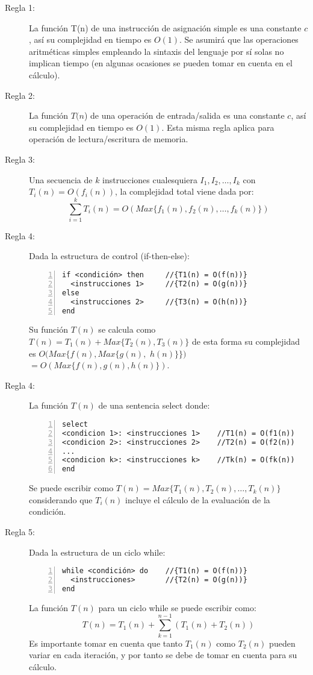 \begin{description}
\item[Regla 1:] La función T(n) de una instrucción de asignación simple es una constante $c$, así su complejidad en tiempo es $O(1)$. Se asumirá que las operaciones aritméticas simples empleando la sintaxis del lenguaje por sí solas no implican tiempo (en algunas ocasiones se pueden tomar en cuenta en el cálculo).

\item[Regla 2:] La función $T(n$) de una operación de entrada/salida es una constante $c$, así su complejidad en tiempo es $O(1)$. Esta misma regla aplica para operación de lectura/escritura de memoria.

\item[Regla 3:] Una secuencia de $k$ instrucciones cualesquiera $I_1, I_2, \dots , I_k$ con $T_i(n) = O(f_i(n))$, la complejidad total viene dada por:
$$\sum_{i=1}^{k}{T_i(n)}=O(Max\{f_1(n), f_2(n), \dots, f_k(n)\})$$

\item[Regla 4:] Dada la estructura de control (if-then-else):
\begin{lstlisting}[upquote=true, language=pseudo, numbers=left]
if <condición> then		//{T1(n) = O(f(n))}
  <instrucciones 1>		//{T2(n) = O(g(n))}
else
  <instrucciones 2>		//{T3(n) = O(h(n))}
end
\end{lstlisting}
\noindent Su función $T(n)$ se calcula como $T(n) = T_1(n) + Max\{T_2(n), T_3(n)\}$ de esta forma su complejidad es $O(Max\{f(n), Max\{g(n),$ $h(n)\}\})$ $= O(Max\{f(n), g(n), h(n)\})$.

\item[Regla 4:] La función $T(n)$ de una sentencia select donde:
\begin{lstlisting}[upquote=true, language=pseudo, numbers=left]
select
<condicion 1>: <instrucciones 1>	//T1(n) = O(f1(n))
<condicion 2>: <instrucciones 2>	//T2(n) = O(f2(n))
...
<condicion k>: <instrucciones k>	//Tk(n) = O(fk(n))
end
\end{lstlisting}

Se puede escribir como $T(n) = Max\{T_1(n), T_2(n), \dots, T_k(n)\}$ considerando que $T_i(n)$ incluye el cálculo de la evaluación de la condición.

\item[Regla 5:] Dada la estructura de un ciclo while:
\begin{lstlisting}[upquote=true, language=pseudo, numbers=left]
while <condición> do	//{T1(n) = O(f(n))}
  <instrucciones>		//{T2(n) = O(g(n))}
end
\end{lstlisting}
La función $T(n)$ para un ciclo while se puede escribir como: 
$$T(n) = T_1(n) + \sum_{k=1}^{n-1}{(T_1(n) + T_2(n))}$$
Es importante tomar en cuenta que tanto $T_1(n)$ como $T_2(n)$ pueden variar en cada iteración, y por tanto se debe de tomar en cuenta para su cálculo.


\end{description}
